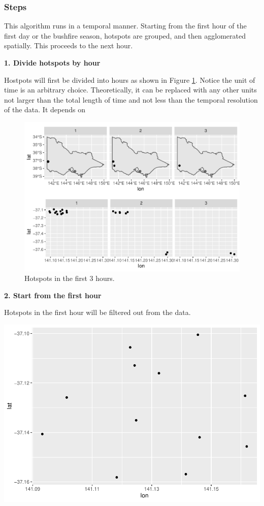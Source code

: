 \hypertarget{steps}{%
\subsubsection{Steps}\label{steps}}

This algorithm runs in a temporal manner. Starting from the first hour
of the first day or the bushfire season, hotspots are grouped, and then
agglomerated spatially. This proceeds to the next hour.

\textbf{1. Divide hotspots by hour}

Hostpots will first be divided into hours as shown in Figure
\ref{fig:step1}. Notice the unit of time is an arbitrary choice.
Theoretically, it can be replaced with any other units not larger than
the total length of time and not less than the temporal resolution of
the data. It depends on

\begin{Schunk}
\begin{figure}
\includegraphics[width=0.8\linewidth]{clustering_paper_files/figure-latex/step1-1} \caption[Hotspots in the first 3 hours]{Hotspots in the first 3 hours.}\label{fig:step1}
\end{figure}
\end{Schunk}

\textbf{2. Start from the first hour}

Hotspots in the first hour will be filtered out from the data.

\begin{Schunk}

\includegraphics[width=0.8\linewidth]{clustering_paper_files/figure-latex/unnamed-chunk-2-1} \end{Schunk}

